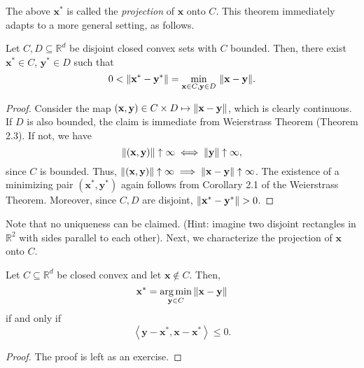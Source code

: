 The above $\mathbf{x}^*$ is called the \emph{projection} of $\mathbf{x}$ onto $C$. This theorem immediately adapts to a more general setting, as follows.

\begin{thm}
    Let $C,D \subseteq \mathbb{R}^d$ be disjoint closed convex sets with $C$ bounded. Then, there exist $\mathbf{x}^* \in C$, $\mathbf{y}^* \in D$ such that
    \[
        0 < \norm{\mathbf{x}^* - \mathbf{y}^*} = \min_{\mathbf{x} \in C , \mathbf{y} \in D} \, \norm{\mathbf{x} - \mathbf{y}}.
    \]
\end{thm}
\begin{proof}
    Consider the map $(\mathbf{x}, \mathbf{y}) \in C \times D \mapsto \norm{\mathbf{x} - \mathbf{y}}$, which is clearly continuous. If $D$ is also bounded, the claim is immediate from Weierstrass Theorem (Theorem 2.3). If not, we have
    \[
        \norm{(\mathbf{x}, \mathbf{y})} \uparrow \infty \iff \norm{\mathbf{y}} \uparrow \infty,
    \]
    since $C$ is bounded. Thus, $\norm{(\mathbf{x}, \mathbf{y})} \uparrow \infty \implies \norm{\mathbf{x} - \mathbf{y}} \uparrow \infty$. The existence of a minimizing pair $(\mathbf{x}^*, \mathbf{y}^*)$ again follows from Corollary 2.1 of the Weierstrass Theorem. Moreover, since $C,D$ are disjoint, $\norm{\mathbf{x}^* - \mathbf{y}^*} > 0$.
\end{proof}
Note that no uniqueness can be claimed. (Hint: imagine two disjoint rectangles in $\mathbb{R}^2$ with sides parallel to each other). Next, we characterize the projection of $\mathbf{x}$ onto $C$.

\begin{thm}
    Let $C \subseteq \mathbb{R}^d$ be closed convex and let $\mathbf{x} \notin C$. Then,
    \[
        \mathbf{x}^* = \operatorname*{arg\,min}_{\mathbf{y} \in C} \norm{\mathbf{x} - \mathbf{y}}
    \]
    if and only if
    \[
        \left\langle \mathbf{y} - \mathbf{x}^*, \mathbf{x} - \mathbf{x}^* \right\rangle \leq 0.
    \]
\end{thm}
\begin{proof}
    The proof is left as an exercise. 
\end{proof}